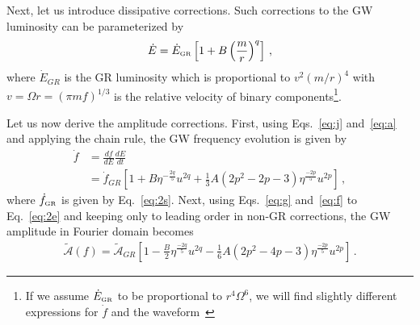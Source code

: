 \documentclass[prd,twocolumn,nofootinbib]{revtex4-1}
\newcommand{\GR}{{\mbox{\tiny GR}}}
\begin{document}
Next, let us introduce dissipative corrections. Such corrections to the GW luminosity can be parameterized by
 \begin{equation}\label{eq:a}
 \dot{E}=\dot{E}_{\GR}\left[1+B\left(\frac{m}{r}\right)^q\right]\,,
 \end{equation}
 where $\dot{E}_{GR}$ is the GR luminosity which is proportional to $v^2(m/r)^4$ with $v=\Omega r = (\pi m f)^{1/3}$ is the relative velocity of binary components\footnote{If we assume $\dot{E}_{\GR}$ to be proportional to $r^4\Omega^6$, we will find slightly different expressions for $\dot{f}$ and the waveform~\cite{Chatziioannou:2012rf}}. 
 
 Let us now derive the amplitude corrections. First, using Eqs.~\eqref{eq:j} and~\eqref{eq:a} and applying the chain rule, the GW frequency evolution is given by
 \begin{align}\label{eq:f}
 \dot{f}&=\frac{df}{dE}\frac{dE}{dt}\nonumber\\ &=\dot{f}_{GR}\left[1+B\eta^{-\frac{2q}{5}} u^{2q}+\frac{1}{3}A(2p^2-2p-3)\eta^{\frac{-2p}{5}}u^{2p} \right]\,,
 \end{align}
where $\dot{f}_{\GR}$ is given by Eq.~\eqref{eq:2s}. 
Next, using Eqs.~\eqref{eq:g} and~\eqref{eq:f} to Eq.~\eqref{eq:2e} and keeping only to leading order in non-GR corrections, the GW amplitude in Fourier domain becomes
\begin{align}\label{eq:o2}
\tilde{\mathcal{A}}(f)=\tilde{\mathcal{A}}_{GR} \left[1-\frac{B}{2}\eta^{\frac{-2q}{5}}u^{2q}-\frac{1}{6}A(2p^2-4p-3)\eta^{\frac{-2p}{5}}u^{2p}\right]\,.
\end{align}
\end{document}
